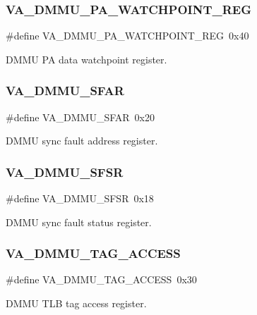\subsubsection{\texorpdfstring{VA\_DMMU\_PA\_WATCHPOINT\_REG}{VA\_DMMU\_PA\_WATCHPOINT\_REG}}
{\footnotesize\ttfamily \#define V\+A\+\_\+\+D\+M\+M\+U\+\_\+\+P\+A\+\_\+\+W\+A\+T\+C\+H\+P\+O\+I\+N\+T\+\_\+\+R\+EG~0x40}

D\+M\+MU PA data watchpoint register. \mbox{\label{group__RTEMSBSPsSPARC64mm_gaee5156f8332f2311409e28f305cc9eba}} 
\subsubsection{\texorpdfstring{VA\_DMMU\_SFAR}{VA\_DMMU\_SFAR}}
{\footnotesize\ttfamily \#define V\+A\+\_\+\+D\+M\+M\+U\+\_\+\+S\+F\+AR~0x20}

D\+M\+MU sync fault address register. \mbox{\label{group__RTEMSBSPsSPARC64mm_ga754ab6f0bc7dad10d9b623bca225c0c2}} 
\subsubsection{\texorpdfstring{VA\_DMMU\_SFSR}{VA\_DMMU\_SFSR}}
{\footnotesize\ttfamily \#define V\+A\+\_\+\+D\+M\+M\+U\+\_\+\+S\+F\+SR~0x18}

D\+M\+MU sync fault status register. \mbox{\label{group__RTEMSBSPsSPARC64mm_ga10d920bd465efdcea357a5691fe0b63d}} 
\subsubsection{\texorpdfstring{VA\_DMMU\_TAG\_ACCESS}{VA\_DMMU\_TAG\_ACCESS}}
{\footnotesize\ttfamily \#define V\+A\+\_\+\+D\+M\+M\+U\+\_\+\+T\+A\+G\+\_\+\+A\+C\+C\+E\+SS~0x30}

D\+M\+MU T\+LB tag access register. \mbox{\label{group__RTEMSBSPsSPARC64mm_ga10ba75010a836780e29d9bd1827c8b63}} 
